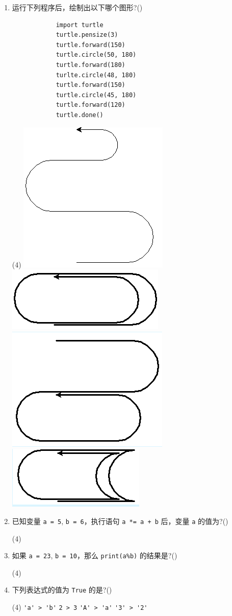 \documentclass[11pt]{ctexart}
\begin{document}
\begin{enumerate}
        \item 运行下列程序后，绘制出以下哪个图形?(\qquad)
        \begin{lstlisting}
            import turtle
            turtle.pensize(3)
            turtle.forward(150)
            turtle.circle(50, 180)
            turtle.forward(180)
            turlte.circle(48, 180)
            turtle.forward(150)
            turtle.circle(45, 180)
            turtle.forward(120)
            turtle.done()
        \end{lstlisting}
        \begin{tasks}(4)
            \task \includegraphics[width=.08\textwidth]{11a.png}
            \task \includegraphics[width=.12\textwidth]{11b.png}
            \task \includegraphics[width=.12\textwidth]{11c.png}
            \task \includegraphics[width=.12\textwidth]{11d.png}
        \end{tasks}

        \item 已知变量 \lstinline{a = 5}, \lstinline{b = 6}，执行语句 \lstinline{a *= a + b} 后，变量 \lstinline{a} 的值为?(\qquad)
        \begin{tasks}(4)
        \end{tasks}

        \newpage
        \item 如果 \lstinline{a = 23}, \lstinline{b = 10}，那么 \lstinline{print(a%b)} 的结果是?(\qquad)
        \begin{tasks}(4)
        \end{tasks}

        \item 下列表达式的值为 \lstinline{True} 的是?(\qquad)
        \begin{tasks}(4)
            \task \lstinline{'a' > 'b'}
            \task \lstinline{2 > 3}
            \task \lstinline{'A' > 'a'}
            \task \lstinline{'3' > '2'}
        \end{tasks}
        

\end{enumerate}
\end{document}
